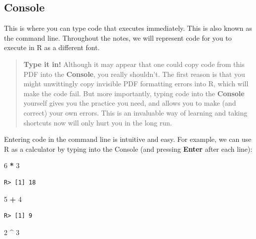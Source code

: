 \documentclass[
]{book}
\newenvironment{Shaded}{\begin{snugshade}}{\end{snugshade}}
\newcommand{\DecValTok}[1]{\textcolor[rgb]{0.00,0.00,0.81}{#1}}
\newcommand{\OperatorTok}[1]{\textcolor[rgb]{0.81,0.36,0.00}{\textbf{#1}}}
\newcommand{\StringTok}[1]{\textcolor[rgb]{0.31,0.60,0.02}{#1}}
\begin{document}
\hypertarget{console}{%
\subsection{Console}\label{console}}

This is where you can type code that executes immediately. This is also known as the command line. Throughout the notes, we will represent code for you to execute in R as a different font.

\begin{quote}
\textbf{Type it in!}
Although it may appear that one could copy code from this PDF into the \textbf{Console}, you really shouldn't. The first reason is that you might unwittingly copy invisible PDF formatting errors into R, which will make the code fail. But more importantly, typing code into the \textbf{Console} yourself gives you the practice you need, and allows you to make (and correct) your own errors. This is an invaluable way of learning and taking shortcuts now will only hurt you in the long run.
\end{quote}

Entering code in the command line is intuitive and easy. For example, we can use R as a calculator by typing into the Console (and pressing \textbf{Enter} after each line):

\begin{Shaded}
\begin{Highlighting}[]
\DecValTok{6} \OperatorTok{*}\StringTok{ }\DecValTok{3}
\end{Highlighting}
\end{Shaded}

\begin{verbatim}
R> [1] 18
\end{verbatim}

\begin{Shaded}
\begin{Highlighting}[]
\DecValTok{5} \OperatorTok{+}\StringTok{ }\DecValTok{4}
\end{Highlighting}
\end{Shaded}

\begin{verbatim}
R> [1] 9
\end{verbatim}

\begin{Shaded}
\begin{Highlighting}[]
\DecValTok{2} \OperatorTok{\^{}}\StringTok{ }\DecValTok{3}
\end{Highlighting}
\end{Shaded}
\end{document}
